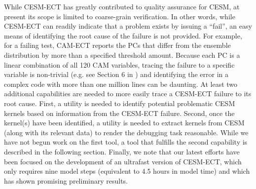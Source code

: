 While CESM-ECT has greatly contributed to quality assurance for CESM,
at present its scope is limited to coarse-grain verification.  In
other words, while CESM-ECT can readily indicate that a problem exists
by issuing a ``fail'', an easy means of identifying the root cause of
the failure is not provided.  For example, for a failing test, CAM-ECT
reports the PCs that differ from the ensemble distribution by more
than a specified threshold amount. Because each PC is a linear
combination of all 120 CAM variables, tracing the failure to a
specific variable is non-trivial (e.g. see Section 6 in
\cite{milroy2016}) and identifying the error in a complex code with
more than one million lines can be daunting.  At least two additional
capabilities are needed to more easily trace a CESM-ECT failure to its
root cause.  First, a utility is needed to identify potential
problematic CESM kernels based on information from the CESM-ECT
failure.  Second, once the kernel(s) have been identified, a utility
is needed to extract kernels from CESM (along with its relevant data)
to render the debugging task reasonable.  While we have not begun work
on the first tool, a tool that fulfills the second capability is
described in the following section.  Finally, we note that our latest
efforts have been focused on the development of an ultrafast version
of CESM-ECT, which only requires nine model steps (equivalent to 4.5
hours in model time) and which has shown promising preliminary
results.
